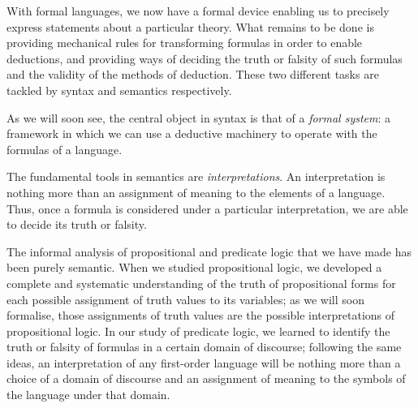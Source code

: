\begin{para}
With formal languages, we now have a formal device enabling us to precisely express statements about a particular theory. What remains to be done is providing mechanical rules for transforming formulas in order to enable deductions, and providing ways of deciding the truth or falsity of such formulas and the validity of the methods of deduction.
These two different tasks are tackled by syntax and semantics respectively.

As we will soon see, the central object in syntax is that of a \emph{formal system}: a framework in which we can use a deductive machinery to operate with the formulas of a language.

The fundamental tools in semantics are \emph{interpretations}. An interpretation is nothing more than an assignment of meaning to the elements of a language. Thus, once a formula is considered under a particular interpretation, we are able to decide its truth or falsity.

The informal analysis of propositional and predicate logic that we have made has been purely semantic.
When we studied propositional logic, we developed a complete and systematic understanding of the truth of propositional forms for each possible assignment of truth values to its variables;
as we will soon formalise, those assignments of truth values are the possible interpretations of propositional logic.
In our study of predicate logic, we learned to identify the truth or falsity of formulas in a certain domain of discourse; 
following the same ideas, an interpretation of any first-order language will be nothing more than a choice of a domain of discourse and an assignment of meaning to the symbols of the language under that domain. 
\end{para}

